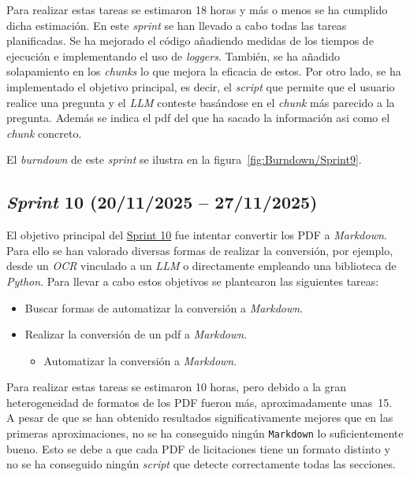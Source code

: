 Para realizar estas tareas se estimaron 18 horas y más o menos se ha cumplido dicha estimación. En este \textit{sprint} se han llevado a cabo todas las tareas planificadas. Se ha mejorado el código añadiendo medidas de los tiempos de ejecución e implementando el uso de \textit{loggers}. También, se ha añadido solapamiento en los \textit{chunks} lo que mejora la eficacia de estos. Por otro lado, se ha implementado el objetivo principal, es decir, el \textit{script} que permite que el usuario realice una pregunta y el \textit{LLM} conteste basándose en el \textit{chunk} más parecido a la pregunta. Además se indica el pdf del que ha sacado la información asi como el \textit{chunk} concreto.

El \textit{burndown} de este \textit{sprint} se ilustra en la figura~\ref{fig:Burndown/Sprint9}.

\subsection{\textit{Sprint} 10 (20/11/2025 -- 27/11/2025)}
El objetivo principal del \href{https://github.com/lbr1014/TFG_RAG/milestone/10?closed=1}{Sprint 10} fue intentar convertir los PDF a \textit{Markdown}. Para ello se han valorado diversas formas de realizar la conversión, por ejemplo, desde un \textit{OCR} vinculado a un \textit{LLM} o directamente empleando una biblioteca de \textit{Python}. Para llevar a cabo estos objetivos se plantearon las siguientes tareas:
\begin{itemize}
\tightlist
	\item Buscar formas de automatizar la conversión a \textit{Markdown}.
	\item Realizar la conversión de un pdf a \textit{Markdown}.
	\begin{itemize}
	\tightlist
		\item Automatizar la conversión a \textit{Markdown}.
	\end{itemize}
\end{itemize}

Para realizar estas tareas se estimaron 10 horas, pero debido a la gran heterogeneidad de formatos de los PDF fueron más, aproximadamente unas~15. A pesar de que se han obtenido resultados significativamente mejores que en las primeras aproximaciones, no se ha conseguido ningún \texttt{Markdown} lo suficientemente bueno. Esto se debe a que cada PDF de licitaciones tiene un formato distinto y no se ha conseguido ningún \textit{script} que detecte correctamente todas las secciones.

